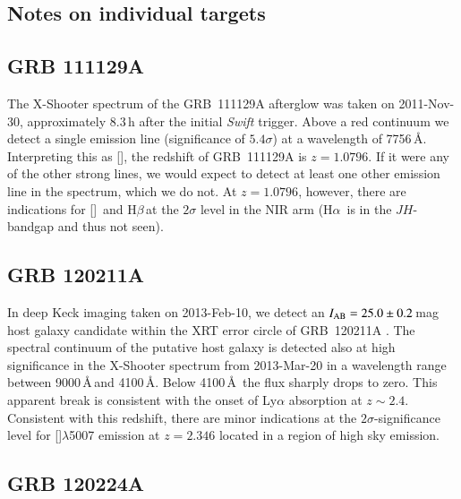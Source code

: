 \documentclass[traditabstract, longauth]{aa}
\newcommand{\hb}{H$\beta$}
\newcommand{\ha}{H$\alpha$}
\newcommand{\oii}{[\ion{O}{ii}]}
\newcommand{\oiii}{[\ion{O}{iii}]}
\begin{document}


\begin{appendix}

\section{Notes on individual targets}
\label{app:newz}

\subsection{GRB 111129A}

The X-Shooter spectrum of the GRB~111129A afterglow \citep{2011GCN..12600...1R} was taken on 2011-Nov-30, approximately 8.3\,h after the initial \textit{Swift} trigger. Above a red continuum \citep{2011GCN..12605...1R} we detect a single emission line (significance of $5.4\sigma$) at a wavelength of 7756\,\AA. Interpreting this as \oii, the redshift of GRB~111129A is $z=1.0796$. If it were any of the other strong lines, we would expect to detect at least one other emission line in the spectrum, which we do not. At $z=1.0796$, however, there are indications for \oiii\, and \hb\,at the $2\sigma$ level in the NIR arm (\ha\, is in the $JH$-bandgap and thus not seen).

\subsection{GRB 120211A}

In deep Keck imaging taken on 2013-Feb-10, we detect an $I_{\rm{AB}}=25.0\pm0.2$\,mag host galaxy candidate within the XRT error circle \citep{2012GCN..12922...1G} of GRB~120211A \citep{2012GCN..12920...1S}. The spectral continuum of the putative host galaxy is detected also at high significance in the X-Shooter spectrum from 2013-Mar-20 in a wavelength range between 9000\,\AA\,and 4100\,\AA. Below 4100\,\AA\, the flux sharply drops to zero. This apparent break is consistent with the onset of Ly$\alpha$ absorption at $z\sim2.4$. Consistent with this redshift, there are minor indications at the $2\sigma$-significance level for \oiii$\lambda$5007 emission at $z=2.346$ located in a region of high sky emission.

\subsection{GRB 120224A}


\end{appendix}
\end{document}

